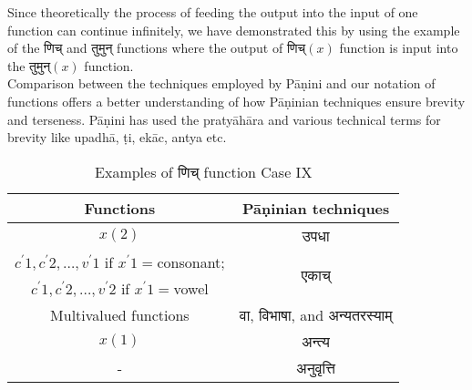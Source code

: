Since theoretically the process of feeding the output into the input of one function can continue infinitely, we have demonstrated this by using the example of the  \texthindi{णिच्} and \texthindi{ तुमुन्} functions where the output of  \texthindi{णिच्}$(x)$ function is input into the \texthindi{तुमुन्}$(x)$ function.\\ 
Comparison between the techniques employed by Pāṇini and our notation of functions offers a better understanding of how Pāṇinian techniques ensure brevity and terseness. Pāṇini has used the pratyāhāra and various technical terms for brevity like upadhā, ṭi, ekāc, antya etc. \\

\begin{table}[h!]
\begin{center}
\begin{tabular}{ |c|c| } 
 \hline
 Functions & Pāṇinian techniques\\
 \hline
 $x(2)$ & \texthindi{ उपधा} \\
 \hline
 $c^{\prime}1,c^{\prime}2,…,v^{\prime}1$ if $x^{\prime}1=$consonant;& \multirow{2}{*}{\texthindi{एकाच्}}\\
$c^{\prime}1,c^{\prime}2,…,v^{\prime}2$ if $x^{\prime}1=$vowel & \\

\hline 
Multivalued functions  & \texthindi{वा, विभाषा,} and \texthindi{अन्यतरस्याम्}\\
\hline
 $x(1)$ & \texthindi{अन्त्य}\\
\hline
 - & \texthindi{अनुवृत्ति }\\
\hline

\end{tabular}
\caption{Examples of \texthindi{णिच्} function Case IX}
\label{table:1}
\end{center}
\end{table}
